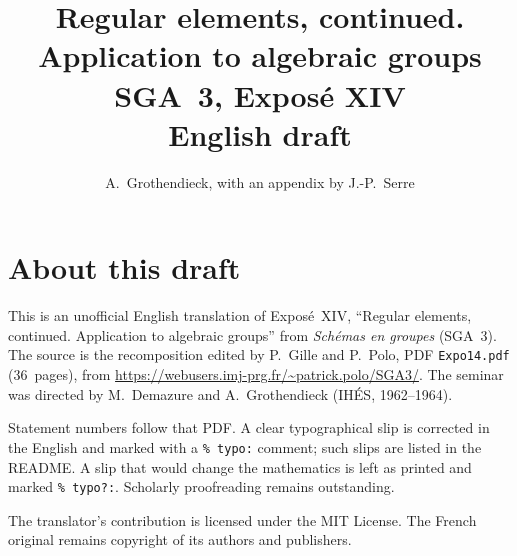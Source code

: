 \documentclass[11pt,a4paper,oneside]{amsbook}
\title[SGA~3, Expos\'e XIV (English draft)]{Regular elements, continued. Application to algebraic groups\\
{\normalsize SGA~3, Expos\'e XIV\\English draft}}
\author{A.\ Grothendieck, with an appendix by J.-P.\ Serre}
\date{}
\begin{document}
\frontmatter
\maketitle

\chapter*{About this draft}
This is an unofficial English translation of Expos\'e~XIV, ``Regular elements, continued. Application to algebraic groups''
from \textit{Sch\'emas en groupes} (SGA~3).
The source is the recomposition edited by P.~Gille and P.~Polo,
PDF \texttt{Expo14.pdf} (36~pages),
from \url{https://webusers.imj-prg.fr/~patrick.polo/SGA3/}.
The seminar was directed by M.~Demazure and A.~Grothendieck
(IH\'ES, 1962--1964).

Statement numbers follow that PDF. A clear typographical slip is
corrected in the English and marked with a \texttt{\% typo:} comment;
such slips are listed in the README. A slip that would change the
mathematics is left as printed and marked \texttt{\% typo?:}.
Scholarly proofreading remains outstanding.

The translator's contribution is licensed under the MIT License.
The French original remains copyright of its authors and publishers.

\tableofcontents
\mainmatter






\end{document}

